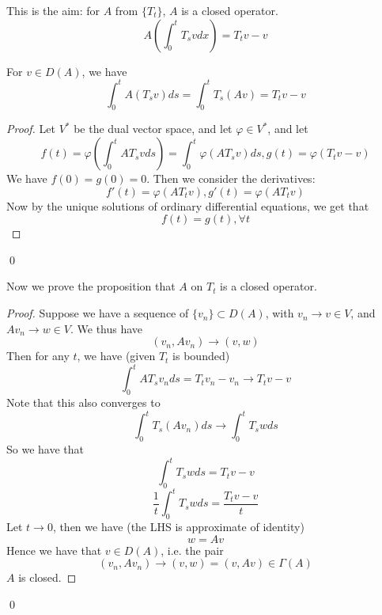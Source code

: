 \begin{proposition}
    This is the aim: for $A$ from $\{T_t\}$, $A$ is a closed operator.
    \begin{equation*}
        A\left(\int_0^tT_svdx\right)=T_tv-v
    \end{equation*}
\end{proposition}
\begin{proposition}
    For $v\in D(A)$, we have
    \begin{equation*}
        \int_0^tA(T_sv)ds=\int_0^tT_s(Av)=T_tv-v
    \end{equation*}
\end{proposition}
\begin{proof}
    Let $V^*$ be the dual vector space, and let $\varphi\in V^*$, and let 
    \begin{equation*}
        f(t)=\varphi\left(\int_0^tAT_svds\right)=\int_0^t\varphi(AT_sv)ds, g(t)=\varphi(T_tv-v)
    \end{equation*}
    We have $f(0)=g(0)=0$. Then we consider the derivatives:
    \begin{equation*}
        f'(t)=\varphi(AT_tv), g'(t)=\varphi(AT_tv)
    \end{equation*}
    Now by the unique solutions of ordinary differential equations, we get that
    \begin{equation*}
        f(t)=g(t), \forall t
    \end{equation*}
\end{proof}
\qed

Now we prove the proposition that $A$ on $T_t$ is a closed operator.
\begin{proof}
    Suppose we have a sequence of $\{v_n\}\subset D(A)$, with $v_n\to v\in V$, and $Av_n\to w\in V$. We thus have
    \begin{equation*}
        (v_n, Av_n)\to (v,w)
    \end{equation*}
    Then for any $t$, we have (given $T_t$ is bounded)
    \begin{equation*}
        \int_0^tAT_sv_nds=T_tv_n-v_n\to T_tv-v
    \end{equation*}
    Note that this also converges to 
    \begin{equation*}
        \int_0^t T_s(Av_n)ds\to \int_0^tT_swds
    \end{equation*}
    So we have that 
    \begin{equation*}
        \int_0^tT_swds=T_tv-v
    \end{equation*}
    \begin{equation*}
        \frac{1}{t}\int_0^tT_swds=\frac{T_tv-v}{t}
    \end{equation*}
    Let $t\to 0$, then we have (the LHS is approximate of identity)
    \begin{equation*}
        w=Av
    \end{equation*}
    Hence we have that $v\in D(A)$, i.e. the pair
    \begin{equation*}
        (v_n, Av_n)\to (v,w)=(v,Av)\in\Gamma(A)
    \end{equation*}
    $A$ is closed.
\end{proof}
\qed

